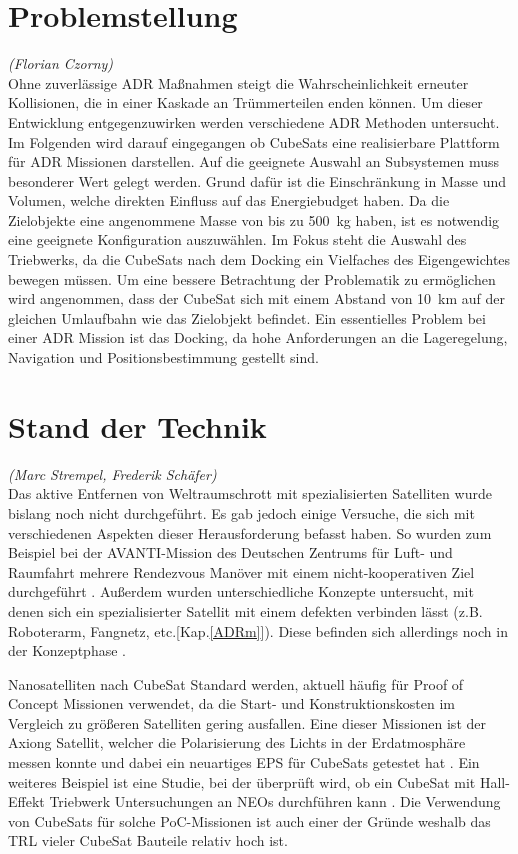 		\section{Problemstellung}
		\hfill\emph{(Florian Czorny)}\\
Ohne zuverlässige ADR Maßnahmen steigt die Wahrscheinlichkeit erneuter Kollisionen, die in einer Kaskade an Trümmerteilen enden können. Um dieser Entwicklung entgegenzuwirken werden verschiedene ADR Methoden untersucht.
Im Folgenden wird darauf eingegangen ob CubeSats eine realisierbare Plattform für ADR Missionen darstellen.
Auf die geeignete Auswahl an Subsystemen muss besonderer Wert gelegt werden. Grund dafür ist die Einschränkung in Masse und Volumen, welche direkten Einfluss auf das Energiebudget haben. Da die Zielobjekte eine angenommene Masse von bis zu \SI{500}{\kilogram} haben, ist es notwendig eine geeignete Konfiguration auszuwählen. Im Fokus steht die Auswahl des Triebwerks, da die CubeSats nach dem Docking ein Vielfaches des Eigengewichtes bewegen müssen. Um eine bessere Betrachtung der Problematik zu ermöglichen wird angenommen, dass der CubeSat sich mit einem Abstand von \SI{10}{\kilo\metre} auf der gleichen Umlaufbahn wie das Zielobjekt befindet. Ein essentielles Problem bei einer ADR Mission ist das Docking, da hohe Anforderungen an die Lageregelung, Navigation und Positionsbestimmung gestellt sind. 

		\section{Stand der Technik}
		\hfill\emph{(Marc Strempel, Frederik Schäfer)}\\	
Das aktive Entfernen von Weltraumschrott mit spezialisierten Satelliten wurde bislang noch nicht durchgeführt. Es gab jedoch einige Versuche, die sich mit verschiedenen Aspekten dieser Herausforderung befasst haben. So wurden zum Beispiel bei der AVANTI-Mission des Deutschen Zentrums für Luft- und Raumfahrt mehrere Rendezvous Manöver mit einem nicht-kooperativen Ziel durchgeführt \cite{Gaias.2018,Gaias.2018b}. 
Außerdem wurden unterschiedliche Konzepte untersucht, mit denen sich ein spezialisierter Satellit mit einem defekten verbinden lässt (z.B. Roboterarm, Fangnetz, etc.[Kap.\ref{ADRm}]). Diese befinden sich allerdings noch in der Konzeptphase \cite{Mark.2019}.

Nanosatelliten nach CubeSat Standard werden, aktuell häufig für Proof of Concept Missionen verwendet, da die Start- und Konstruktionskosten im Vergleich zu größeren Satelliten gering ausfallen. Eine dieser Missionen ist der Axiong Satellit, welcher die Polarisierung des Lichts in der Erdatmosphäre messen konnte und dabei ein neuartiges EPS für CubeSats getestet hat \cite{Peng.2018}. Ein weiteres Beispiel ist eine Studie, bei der überprüft wird, ob ein CubeSat mit Hall-Effekt Triebwerk Untersuchungen an NEOs durchführen kann \cite{UniversityofStrathclydeGlasgow.2018}. Die Verwendung von CubeSats für solche PoC-Missionen ist auch einer der Gründe weshalb das TRL vieler CubeSat Bauteile relativ hoch ist.



